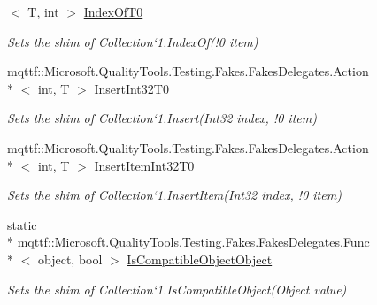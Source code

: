 \begin{DoxyCompactItemize}
$<$ T, int $>$ \hyperlink{class_system_1_1_collections_1_1_object_model_1_1_fakes_1_1_shim_collection_3_01_t_01_4_a9410a51aa32fd25aa41816cc7a5461da}{Index\-Of\-T0}
\begin{DoxyCompactList}\small\item\em Sets the shim of Collection`1.Index\-Of(!0 item)\end{DoxyCompactList}\item 
mqttf\-::\-Microsoft.\-Quality\-Tools.\-Testing.\-Fakes.\-Fakes\-Delegates.\-Action\\*
$<$ int, T $>$ \hyperlink{class_system_1_1_collections_1_1_object_model_1_1_fakes_1_1_shim_collection_3_01_t_01_4_af3c64335f1659bb8da5daa333fae7917}{Insert\-Int32\-T0}
\begin{DoxyCompactList}\small\item\em Sets the shim of Collection`1.Insert(Int32 index, !0 item)\end{DoxyCompactList}\item 
mqttf\-::\-Microsoft.\-Quality\-Tools.\-Testing.\-Fakes.\-Fakes\-Delegates.\-Action\\*
$<$ int, T $>$ \hyperlink{class_system_1_1_collections_1_1_object_model_1_1_fakes_1_1_shim_collection_3_01_t_01_4_a5f46e17014bb493a83d2208771c2aa4e}{Insert\-Item\-Int32\-T0}
\begin{DoxyCompactList}\small\item\em Sets the shim of Collection`1.Insert\-Item(Int32 index, !0 item)\end{DoxyCompactList}\item 
static \\*
mqttf\-::\-Microsoft.\-Quality\-Tools.\-Testing.\-Fakes.\-Fakes\-Delegates.\-Func\\*
$<$ object, bool $>$ \hyperlink{class_system_1_1_collections_1_1_object_model_1_1_fakes_1_1_shim_collection_3_01_t_01_4_aae635751e6b794c6cb6df1771ed7c9e6}{Is\-Compatible\-Object\-Object}
\begin{DoxyCompactList}\small\item\em Sets the shim of Collection`1.Is\-Compatible\-Object(\-Object value)\end{DoxyCompactList}\item 

\end{DoxyCompactItemize}
